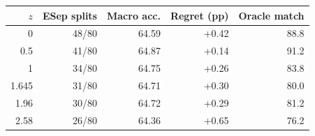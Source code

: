 \begin{tabular}{rrrrr}
\toprule
$z$ & ESep splits & Macro acc. & Regret (pp) & Oracle match \\
\midrule
0 & 48/80 & 64.59 & +0.42 & 88.8 \\
0.5 & 41/80 & 64.87 & +0.14 & 91.2 \\
1 & 34/80 & 64.75 & +0.26 & 83.8 \\
1.645 & 31/80 & 64.71 & +0.30 & 80.0 \\
1.96 & 30/80 & 64.72 & +0.29 & 81.2 \\
2.58 & 26/80 & 64.36 & +0.65 & 76.2 \\
\bottomrule
\end{tabular}
